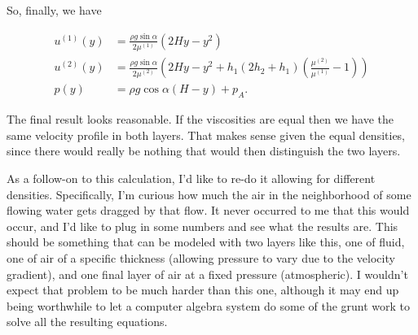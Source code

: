 So, finally, we have

\begin{align}\label{eqn:twoLayerInclinedFlow:575}
u^{(1)}(y) &= \frac{\rho g \sin\alpha }{2 \mu^{(1)}} (2 H y -y^2) \\
u^{(2)}(y) &= \frac{\rho g \sin\alpha }{2 \mu^{(2)}} \left( 2 H y -y^2 + h_1 (2 h_2 + h_1) 
\left( \frac{\mu^{(2)}}{\mu^{(1)}} - 1 \right)
\right) \\
p(y) &= \rho g \cos\alpha (H - y) + p_A.
\end{align}

The final result looks reasonable.  If the viscosities are equal then we have the same velocity profile in both layers.  That makes sense given the equal densities, since there would really be nothing that would then distinguish the two layers.

As a follow-on to this calculation, I'd like to re-do it allowing for different densities.  Specifically, I'm curious how much the air in the neighborhood of some flowing water gets dragged by that flow.  It never occurred to me that this would occur, and I'd like to plug in some numbers and see what the results are.  This should be something that can be modeled with two layers like this, one of fluid, one of air of a specific thickness (allowing pressure to vary due to the velocity gradient), and one final layer of air at a fixed pressure (atmospheric).  I wouldn't expect that problem to be much harder than this one, although it may end up being worthwhile to let a computer algebra system do some of the grunt work to solve all the resulting equations.

\EndArticle
